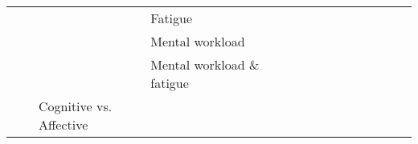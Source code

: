 \begin{tabular}{p{1.5cm}p{1.5cm}p{1.5cm}p{1.5cm}p{0.6cm}p{0.6cm}p{0.6cm}p{0.6cm}p{0.6cm}p{0.6cm}p{0.6cm}p{0.6cm}p{0.6cm}p{0.6cm}p{0.6cm}}
                                &                 &                   & Fatigue &                                                             &                                                                                                      \cite{Hajinoroozi2016} &                                                                        &                                      &                                                            &                      &                         &                               &                     &                         &                                                                      \\
                                &                 &                   & Mental workload &                                   \cite{Yin2017a, Yin2016b} &                                                                                              \cite{Almogbel2018, Zhang2017} &                                          \cite{Hefron2018, Kuanar2018} &                                      &                                                            &                      &                         &                               &                     &                         &                                                    \cite{Hefron2017} \\
                                &                 &                   & Mental workload \& fatigue &                                                             &                                                                                                                             &                                                                        &                       \cite{Yin2017} &                                                            &                      &                         &                               &                     &                         &                                                                      \\
                                &                 & Cognitive vs. Affective &   &                                                             &                                                                                                                             &                                                                        &                 \cite{Bashivan2016b} &                                                            &                      &                         &                               &                     &                         &                                                                      \\

\end{tabular}
